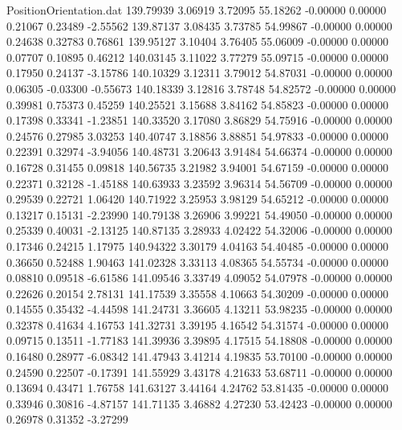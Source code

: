 \begin{filecontents}{PositionOrientation.dat}
 139.79939    3.06919    3.72095    55.18262   -0.00000    0.00000    0.21067    0.23489   -2.55562
 139.87137    3.08435    3.73785    54.99867   -0.00000    0.00000    0.24638    0.32783    0.76861
 139.95127    3.10404    3.76405    55.06009   -0.00000    0.00000    0.07707    0.10895    0.46212
 140.03145    3.11022    3.77279    55.09715   -0.00000    0.00000    0.17950    0.24137   -3.15786
 140.10329    3.12311    3.79012    54.87031   -0.00000    0.00000    0.06305   -0.03300   -0.55673
 140.18339    3.12816    3.78748    54.82572   -0.00000    0.00000    0.39981    0.75373    0.45259
 140.25521    3.15688    3.84162    54.85823   -0.00000    0.00000    0.17398    0.33341   -1.23851
 140.33520    3.17080    3.86829    54.75916   -0.00000    0.00000    0.24576    0.27985    3.03253
 140.40747    3.18856    3.88851    54.97833   -0.00000    0.00000    0.22391    0.32974   -3.94056
 140.48731    3.20643    3.91484    54.66374   -0.00000    0.00000    0.16728    0.31455    0.09818
 140.56735    3.21982    3.94001    54.67159   -0.00000    0.00000    0.22371    0.32128   -1.45188
 140.63933    3.23592    3.96314    54.56709   -0.00000    0.00000    0.29539    0.22721    1.06420
 140.71922    3.25953    3.98129    54.65212   -0.00000    0.00000    0.13217    0.15131   -2.23990
 140.79138    3.26906    3.99221    54.49050   -0.00000    0.00000    0.25339    0.40031   -2.13125
 140.87135    3.28933    4.02422    54.32006   -0.00000    0.00000    0.17346    0.24215    1.17975
 140.94322    3.30179    4.04163    54.40485   -0.00000    0.00000    0.36650    0.52488    1.90463
 141.02328    3.33113    4.08365    54.55734   -0.00000    0.00000    0.08810    0.09518   -6.61586
 141.09546    3.33749    4.09052    54.07978   -0.00000    0.00000    0.22626    0.20154    2.78131
 141.17539    3.35558    4.10663    54.30209   -0.00000    0.00000    0.14555    0.35432   -4.44598
 141.24731    3.36605    4.13211    53.98235   -0.00000    0.00000    0.32378    0.41634    4.16753
 141.32731    3.39195    4.16542    54.31574   -0.00000    0.00000    0.09715    0.13511   -1.77183
 141.39936    3.39895    4.17515    54.18808   -0.00000    0.00000    0.16480    0.28977   -6.08342
 141.47943    3.41214    4.19835    53.70100   -0.00000    0.00000    0.24590    0.22507   -0.17391
 141.55929    3.43178    4.21633    53.68711   -0.00000    0.00000    0.13694    0.43471    1.76758
 141.63127    3.44164    4.24762    53.81435   -0.00000    0.00000    0.33946    0.30816   -4.87157
 141.71135    3.46882    4.27230    53.42423   -0.00000    0.00000    0.26978    0.31352   -3.27299

\end{filecontents}
